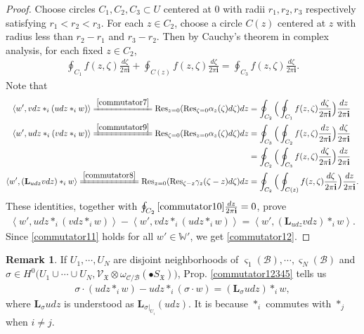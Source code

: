 \documentclass[11pt,b5paper,notitlepage]{article}
\theoremstyle{definition}
\newtheorem{rem}[df]{Remark}
\theoremstyle{plain}
\newcommand{\Lbf}{\mathbf{L}}
\newcommand{\Res}{\mathrm{Res}}
\newcommand{\SV}{\mathscr{V}}
\newcommand{\im}{\mathbf{i}}
\newcommand{\sgm}{\varsigma}
\newcommand{\blt}{\bullet}
\newcommand{\Wbb}{\mathbb W}
\newcommand{\<}{\left\langle}
\renewcommand{\>}{\right\rangle}
\newcommand{\MC}{\mathcal{C}}
\newcommand{\MB}{\mathcal{B}}
\newcommand{\fx}{\mathfrak{X}}
\numberwithin{equation}{subsection}
\begin{document}
\begin{proof}
    Choose circles $C_1,C_2,C_3\subset U$ centered at $0$ with radii $r_1,r_2,r_3$ respectively satisfying $r_1<r_2<r_3$. For each $z\in C_2$, choose a circle $C(z)$ centered at $z$ with radius less than $r_2-r_1$ and $r_3-r_2$. Then by Cauchy's theorem in complex analysis, for each fixed $z\in C_2$,
    \begin{align}\label{commutator10}
        \oint_{C_1}f(z,\zeta)\frac{d\zeta}{2\pi \im}+\oint_{C(z)}f(z,\zeta)\frac{d\zeta}{2\pi \im}=\oint_{C_3}f(z,\zeta)\frac{d\zeta}{2\pi \im}.
    \end{align}
    Note that 
    \begin{align*}
        \<w',vdz*_i (udz*_i w)\>\xlongequal{\eqref{commutator7}} \Res_{z=0}(\Res_{\zeta=0}\alpha_z(\zeta)d\zeta)dz&=\oint_{C_2}\Big(\oint_{C_1}f(z,\zeta)\frac{d\zeta}{2\pi \im}\Big)\frac{dz}{2\pi \im}\\
        \<w',udz*_i (vdz*_i w)\>\xlongequal{\eqref{commutator9}} \Res_{\zeta=0}(\Res_{z=0}\alpha_z(\zeta)d\zeta)dz&=\oint_{C_3}\Big(\oint_{C_2}f(z,\zeta)\frac{dz}{2\pi \im}\Big)\frac{d\zeta}{2\pi \im}\\
        &=\oint_{C_2}\Big(\oint_{C_3}f(z,\zeta)\frac{d\zeta}{2\pi \im}\Big)\frac{dz}{2\pi \im}\\
        \<w',(\Lbf_{udz}vdz)*_i w\>\xlongequal{\eqref{commutator8}} \Res_{z=0}(\Res_{\zeta-z}\gamma_z(\zeta-z)d\zeta)dz&=\oint_{C_2}\Big(\oint_{C(z)}f(z,\zeta)\frac{d\zeta}{2\pi \im}\Big)\frac{dz}{2\pi \im}.
    \end{align*}
    These identities, together with $\oint_{C_2}\eqref{commutator10}\frac{dz}{2\pi \im}=0$, prove
    \begin{align}\label{commutator11}
        \<w',udz*_i (vdz*_i w)\>-\<w',vdz*_i(udz*_i w)\>=\<w',(\Lbf_{udz}vdz)*_i w\>.
    \end{align}
    Since \eqref{commutator11} holds for all $w'\in \Wbb'$, we get \eqref{commutator12}.
\end{proof}
\begin{rem}
    If $U_1,\cdots,U_N$ are disjoint neighborhoods of $\sgm_1(\MB),\cdots,\sgm_N(\MB)$ and $\sigma\in H^0\big(U_1\cup \cdots \cup U_N,\SV_\fx\otimes \omega_{\MC/\MB}(\blt S_\fx)\big)$, Prop. \ref{commutator12345} tells us 
    \begin{align}\label{commutator666}
        \sigma\cdot (udz*_i w)-udz*_i(\sigma\cdot w)=(\Lbf_{\sigma}udz)*_i w,
    \end{align}
    where $\Lbf_{\sigma}udz$ is understood as $\Lbf_{\sigma\vert_{U_i}}(udz)$. It is because $*_i$ commutes with $*_j$ when $i\ne j$.
\end{rem}
\end{document}
